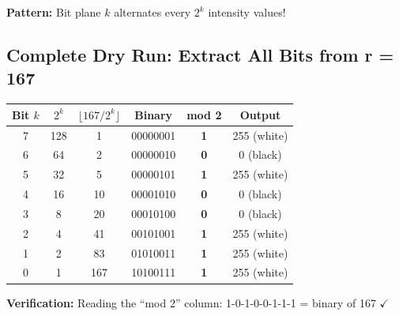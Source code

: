 \documentclass[12pt,a4paper]{article}
\begin{document}
\begin{center}
\end{center}

\textbf{Pattern:} Bit plane $k$ alternates every $2^k$ intensity values!

\subsection{Complete Dry Run: Extract All Bits from r = 167}

\begin{center}
\renewcommand{\arraystretch}{1.5}
\begin{tabular}{|c|c|c|c|c|c|}
\hline
\textbf{Bit $k$} & \textbf{$2^k$} & \textbf{$\lfloor 167/2^k \rfloor$} & \textbf{Binary} & \textbf{mod 2} & \textbf{Output} \\
\hline
7 & 128 & 1 & 00000001 & \textbf{1} & 255 (white) \\
6 & 64 & 2 & 00000010 & \textbf{0} & 0 (black) \\
5 & 32 & 5 & 00000101 & \textbf{1} & 255 (white) \\
4 & 16 & 10 & 00001010 & \textbf{0} & 0 (black) \\
3 & 8 & 20 & 00010100 & \textbf{0} & 0 (black) \\
2 & 4 & 41 & 00101001 & \textbf{1} & 255 (white) \\
1 & 2 & 83 & 01010011 & \textbf{1} & 255 (white) \\
0 & 1 & 167 & 10100111 & \textbf{1} & 255 (white) \\
\hline
\end{tabular}
\end{center}

\textbf{Verification:} Reading the ``mod 2'' column: 1-0-1-0-0-1-1-1 = binary of 167 $\checkmark$
\end{document}
